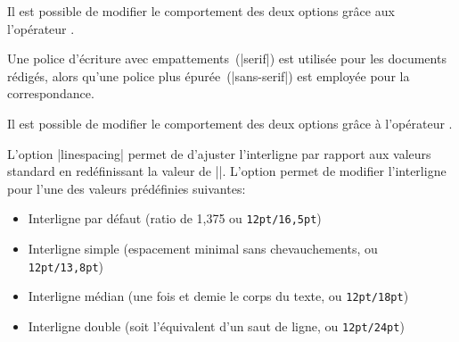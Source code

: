 \begin{developer}
Il est possible de modifier le comportement des deux options grâce aux l'opérateur .
\end{developer}

\begin{noprint}
\end{noprint}

Une police d'écriture avec empattements~(|serif|) est utilisée pour les documents rédigés, alors qu'une police plus épurée~(|sans-serif|) est employée pour la correspondance.

\begin{developer}
Il est possible de modifier le comportement des deux options grâce à l'opérateur .
\end{developer}

\begin{noprint}
\end{noprint}

L'option |linespacing| permet de d'ajuster l'interligne par rapport aux valeurs standard en redéfinissant la valeur de |\baselinestretch|. L'option permet de modifier l'interligne pour l'une des valeurs prédéfinies suivantes:
\begin{itemize}
\item Interligne par défaut (ratio de 1,375 ou \texttt{12pt/16,5pt})
\item Interligne simple (espacement minimal sans chevauchements, ou \texttt{12pt/13,8pt})
\item Interligne médian (une fois et demie le corps du texte, ou \texttt{12pt/18pt})
\item Interligne double (soit l'équivalent d'un saut de ligne, ou \texttt{12pt/24pt})
\end{itemize}

